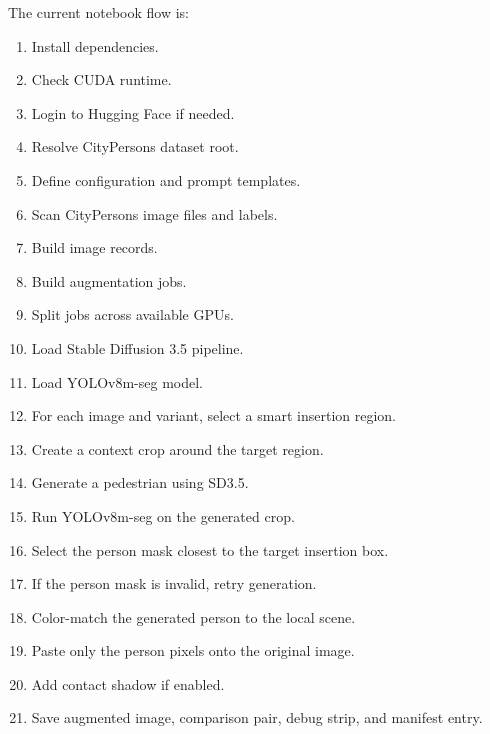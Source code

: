 \documentclass[12pt,a4paper]{article}
\begin{document}
The current notebook flow is:

\begin{enumerate}
    \item Install dependencies.
    \item Check CUDA runtime.
    \item Login to Hugging Face if needed.
    \item Resolve CityPersons dataset root.
    \item Define configuration and prompt templates.
    \item Scan CityPersons image files and labels.
    \item Build image records.
    \item Build augmentation jobs.
    \item Split jobs across available GPUs.
    \item Load Stable Diffusion 3.5 pipeline.
    \item Load YOLOv8m-seg model.
    \item For each image and variant, select a smart insertion region.
    \item Create a context crop around the target region.
    \item Generate a pedestrian using SD3.5.
    \item Run YOLOv8m-seg on the generated crop.
    \item Select the person mask closest to the target insertion box.
    \item If the person mask is invalid, retry generation.
    \item Color-match the generated person to the local scene.
    \item Paste only the person pixels onto the original image.
    \item Add contact shadow if enabled.
    \item Save augmented image, comparison pair, debug strip, and manifest entry.
\end{enumerate}
\end{document}
